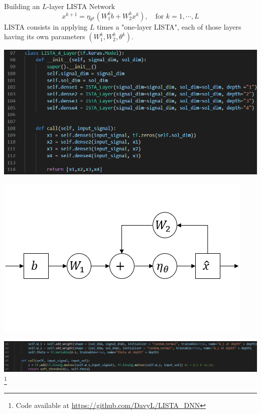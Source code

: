 \documentclass{beamer}
\begin{document}
\begin{frame}{Building an $L$-layer LISTA Network}
    \begin{equation*}
        x^{k+1} = \eta_{\theta^k}(W_1^kb + W_2^kx^k), \quad\text{for } k=1,\cdots,L
    \end{equation*}
    LISTA consists in applying $L$ times a "one-layer LISTA", each of those layers having its own parameters $(W_1^k, W_2^k, \theta^k)$.
    \begin{minipage}{0.7\textwidth}
        \includegraphics[width=1.0\textwidth]{code_def_4_layer}
    \end{minipage}%
    \begin{minipage}[c]{0.29\textwidth}%
        \includegraphics[width=\textwidth]{RNN_LISTA.png}
    \end{minipage}
    \includegraphics[width = \textwidth]{code_def_1_layer.png}
    \let\thefootnote\relax\footnote{Code available at \url{https://github.com/DavyL/LISTA_DNN}}
\end{frame}
\end{document}
